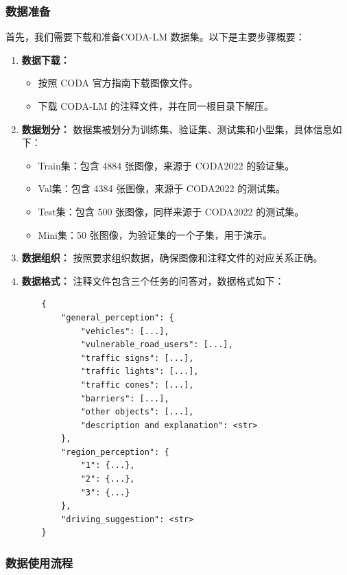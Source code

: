 \documentclass[
    linespread = 1.25
]{ctexart}
\begin{document}
\subsubsection{数据准备}
首先，我们需要下载和准备CODA-LM 数据集。以下是主要步骤概要：

\begin{enumerate}
  \item \textbf{数据下载：}
        \begin{itemize}
          \item 按照 CODA 官方指南下载图像文件。
          \item 下载 CODA-LM 的注释文件，并在同一根目录下解压。
        \end{itemize}

  \item \textbf{数据划分：} 数据集被划分为训练集、验证集、测试集和小型集，具体信息如下：
        \begin{itemize}
          \item Train集：包含 4884 张图像，来源于 CODA2022 的验证集。
          \item Val集：包含 4384 张图像，来源于 CODA2022 的测试集。
          \item Test集：包含 500 张图像，同样来源于 CODA2022 的测试集。
          \item Mini集：50 张图像，为验证集的一个子集，用于演示。
        \end{itemize}
  \item \textbf{数据组织：} 按照要求组织数据，确保图像和注释文件的对应关系正确。
  \item \textbf{数据格式：}
        注释文件包含三个任务的问答对，数据格式如下：
        \begin{verbatim}
    {
        "general_perception": {
            "vehicles": [...],
            "vulnerable_road_users": [...],
            "traffic signs": [...],
            "traffic lights": [...],
            "traffic cones": [...],
            "barriers": [...],
            "other objects": [...],
            "description and explanation": <str>
        },
        "region_perception": {
            "1": {...},
            "2": {...},
            "3": {...}
        },
        "driving_suggestion": <str>
    }
    \end{verbatim}
\end{enumerate}

\subsubsection{数据使用流程}
\end{document}
